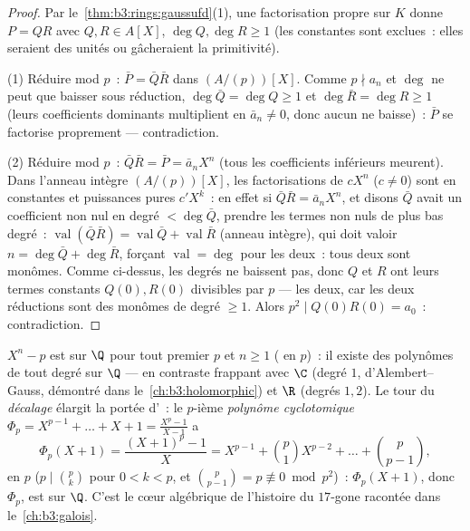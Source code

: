 \begin{proof}
Par le~\cref{thm:b3:rings:gaussufd}(1), une factorisation propre
sur $K$ donne $P = QR$ avec $Q, R \in A[X]$, $\deg Q, \deg R
\geq 1$ (les constantes sont exclues~: elles seraient des unités
ou gâcheraient la primitivité).

(1) Réduire mod $p$~: $\bar P = \bar Q\bar R$ dans
$(A/(p))[X]$. Comme $p \nmid a_n$ et $\deg$ ne peut que baisser
sous réduction, $\deg \bar Q = \deg Q \geq 1$ et $\deg\bar R =
\deg R \geq 1$ (leurs coefficients dominants multiplient en
$\bar a_n \neq 0$, donc aucun ne baisse)~: $\bar P$ se factorise
proprement --- contradiction.

(2) Réduire mod $p$~: $\bar Q \bar R = \bar P = \bar a_n X^n$
(tous les coefficients inférieurs meurent). Dans l'anneau
intègre $(A/(p))[X]$, les factorisations de $cX^n$ ($c \ne 0$)
sont en constantes et puissances pures $c'X^k$~: en effet si
$\bar Q\bar R = \bar a_nX^n$, et disons $\bar Q$ avait un
coefficient non nul en degré $< \deg\bar Q$, prendre les termes
non nuls de plus bas degré~: $\operatorname{val}(\bar Q\bar R) =
\operatorname{val}\bar Q + \operatorname{val}\bar R$ (anneau
intègre), qui doit valoir $n = \deg\bar Q + \deg\bar R$,
forçant $\operatorname{val} = \deg$ pour les deux~: tous deux
sont monômes. Comme ci-dessus, les degrés ne baissent pas, donc
$Q$ et $R$ ont leurs termes constants $Q(0), R(0)$ divisibles
par $p$ --- les deux, car les deux réductions sont des monômes
de degré $\geq 1$. Alors $p^2 \mid Q(0)R(0) = a_0$~:
contradiction.
\end{proof}

\begin{example}\label{ex:b3:rings:eisenstein}
$X^n - p$ est  sur $\Q$ pour tout premier $p$ et $n
\geq 1$ ( en $p$)~: il existe des polynômes
 de tout degré sur $\Q$ --- en contraste frappant
avec $\C$ (degré $1$, d'Alembert--Gauss, démontré dans
le~\cref{ch:b3:holomorphic}) et $\R$ (degrés $1, 2$). Le tour du
\emph{décalage} élargit la portée d'~: le $p$-ième
\emph{polynôme cyclotomique}
$\Phi_p = X^{p-1} + \dots + X + 1 = \frac{X^p - 1}{X - 1}$ a
\[
\Phi_p(X + 1) = \frac{(X+1)^p - 1}{X}
= X^{p-1} + \binom{p}{1}X^{p-2} + \dots + \binom{p}{p-1},
\]
 en $p$ ($p \mid \binom pk$ pour $0 < k < p$, et
$\binom{p}{p-1} = p \not\equiv 0 \bmod p^2$)~: $\Phi_p(X+1)$,
donc $\Phi_p$, est  sur $\Q$. C'est le cœur
algébrique de l'histoire du $17$-gone racontée dans
le~\cref{ch:b3:galois}.
\end{example}

